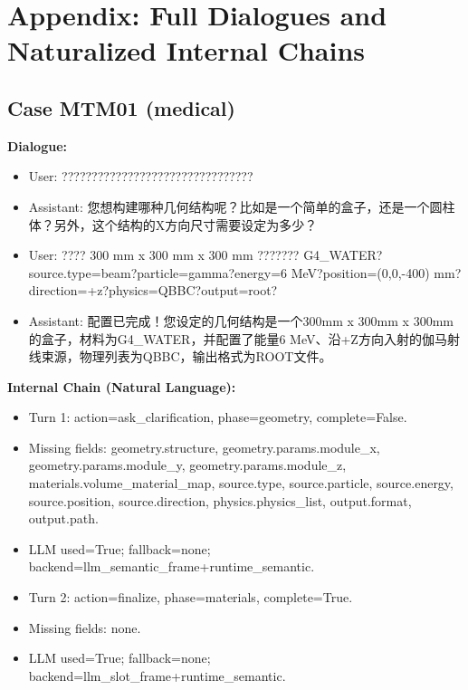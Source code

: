 \documentclass[11pt]{ctexart}
\begin{document}
\section{Appendix: Full Dialogues and Naturalized Internal Chains}
\subsection{Case MTM01 (medical)}
\textbf{Dialogue:}
\begin{itemize}
\item User: ????????????????????????????????
\item Assistant: 您想构建哪种几何结构呢？比如是一个简单的盒子，还是一个圆柱体？另外，这个结构的X方向尺寸需要设定为多少？
\item User: ???? 300 mm x 300 mm x 300 mm ??????? G4\_WATER?source.type=beam?particle=gamma?energy=6 MeV?position=(0,0,-400) mm?direction=+z?physics=QBBC?output=root?
\item Assistant: 配置已完成！您设定的几何结构是一个300mm x 300mm x 300mm的盒子，材料为G4\_WATER，并配置了能量6 MeV、沿+Z方向入射的伽马射线束源，物理列表为QBBC，输出格式为ROOT文件。
\end{itemize}
\textbf{Internal Chain (Natural Language):}
\begin{itemize}
\item Turn 1: action=ask\_clarification, phase=geometry, complete=False.
\item Missing fields: geometry.structure, geometry.params.module\_x, geometry.params.module\_y, geometry.params.module\_z, materials.volume\_material\_map, source.type, source.particle, source.energy, source.position, source.direction, physics.physics\_list, output.format, output.path.
\item LLM used=True; fallback=none; backend=llm\_semantic\_frame+runtime\_semantic.
\item Turn 2: action=finalize, phase=materials, complete=True.
\item Missing fields: none.
\item LLM used=True; fallback=none; backend=llm\_slot\_frame+runtime\_semantic.
\end{itemize}
\end{document}
